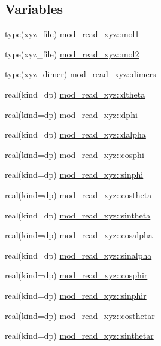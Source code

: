 \subsection*{Variables}
\begin{DoxyCompactItemize}
\item 
type(xyz\+\_\+file) \hyperlink{namespacemod__read__xyz_a4f9bfbc2e65fbc70f98f0dd5482a86f0}{mod\+\_\+read\+\_\+xyz\+::mol1}
\item 
type(xyz\+\_\+file) \hyperlink{namespacemod__read__xyz_ad6455b07e3bcbb980fd81f7a6a61d835}{mod\+\_\+read\+\_\+xyz\+::mol2}
\item 
type(xyz\+\_\+dimer) \hyperlink{namespacemod__read__xyz_aa013f111078e556f2e4eee9018cd605a}{mod\+\_\+read\+\_\+xyz\+::dimers}
\item 
real(kind=dp) \hyperlink{namespacemod__read__xyz_a12174845302ad3f92b147b671045e952}{mod\+\_\+read\+\_\+xyz\+::dtheta}
\item 
real(kind=dp) \hyperlink{namespacemod__read__xyz_a7d29c731d6db9ccacae5b6e2fb25f4c5}{mod\+\_\+read\+\_\+xyz\+::dphi}
\item 
real(kind=dp) \hyperlink{namespacemod__read__xyz_a41a3fdae2ca35a3a22c0ed3bce4ab65f}{mod\+\_\+read\+\_\+xyz\+::dalpha}
\item 
real(kind=dp) \hyperlink{namespacemod__read__xyz_a9ce51beca027f9eeb6aa61284b343add}{mod\+\_\+read\+\_\+xyz\+::cosphi}
\item 
real(kind=dp) \hyperlink{namespacemod__read__xyz_a183d28b4e8d41fd8eefe9239450cb5f7}{mod\+\_\+read\+\_\+xyz\+::sinphi}
\item 
real(kind=dp) \hyperlink{namespacemod__read__xyz_ae522e26e0e7e87987ca7018f36b43903}{mod\+\_\+read\+\_\+xyz\+::costheta}
\item 
real(kind=dp) \hyperlink{namespacemod__read__xyz_af660cbed16517234379cfffe0132378f}{mod\+\_\+read\+\_\+xyz\+::sintheta}
\item 
real(kind=dp) \hyperlink{namespacemod__read__xyz_a932bb57fc8636b50b040311a48f5f5ff}{mod\+\_\+read\+\_\+xyz\+::cosalpha}
\item 
real(kind=dp) \hyperlink{namespacemod__read__xyz_a97d484f8583bf1d60e6d02230e28feb3}{mod\+\_\+read\+\_\+xyz\+::sinalpha}
\item 
real(kind=dp) \hyperlink{namespacemod__read__xyz_a41be340f1c832ab4905f7e17f6ebe4ff}{mod\+\_\+read\+\_\+xyz\+::cosphir}
\item 
real(kind=dp) \hyperlink{namespacemod__read__xyz_a446fc19de6fe61df592b2f68c8a86ca3}{mod\+\_\+read\+\_\+xyz\+::sinphir}
\item 
real(kind=dp) \hyperlink{namespacemod__read__xyz_a4fe5cc70aa62a1a36598156d04828c90}{mod\+\_\+read\+\_\+xyz\+::costhetar}
\item 
real(kind=dp) \hyperlink{namespacemod__read__xyz_ad3f08d13679d5f31c776b74f1abe0da5}{mod\+\_\+read\+\_\+xyz\+::sinthetar}
\end{DoxyCompactItemize}
